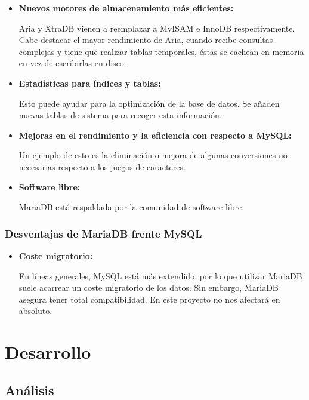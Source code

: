 \documentclass[openright,twoside,10pt]{book}
\begin{document}
    \begin{itemize}
    \item
      \textbf{Nuevos motores de almacenamiento más eficientes:}
    
      Aria y XtraDB vienen a reemplazar a MyISAM e InnoDB respectivamente.
      Cabe destacar el mayor rendimiento de Aria, cuando recibe consultas
      complejas y tiene que realizar tablas temporales, éstas se cachean en
      memoria en vez de escribirlas en disco.
    \item
      \textbf{Estadísticas para índices y tablas:}
    
      Esto puede ayudar para la optimización de la base de datos. Se añaden
      nuevas tablas de sistema para recoger esta información.
    \item
      \textbf{Mejoras en el rendimiento y la eficiencia con respecto a
      MySQL:}
    
      Un ejemplo de esto es la eliminación o mejora de algunas conversiones
      no necesarias respecto a los juegos de caracteres.
    \item
      \textbf{Software libre:}
    
      MariaDB está respaldada por la comunidad de software libre.
    \end{itemize}
    
    \subsection{Desventajas de MariaDB frente
    MySQL}\label{desventajas-de-mariadb-frente-mysql}
    
    \begin{itemize}
    \item
      \textbf{Coste migratorio:}
    
      En líneas generales, MySQL está más extendido, por lo que utilizar
      MariaDB suele acarrear un coste migratorio de los datos. Sin embargo,
      MariaDB asegura tener total compatibilidad. En este proyecto no nos
      afectará en absoluto.
    \end{itemize}
    
    \chapter{Desarrollo}\label{desarrollo}
    
    \section{Análisis}\label{anuxe1lisis}
    
\end{document}
